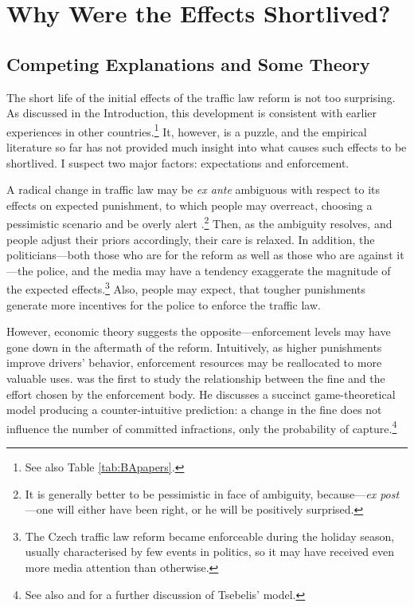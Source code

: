 \documentclass[12pt]{article}
\begin{document}
\section{Why Were the Effects Shortlived?} %
\label{sec:police}

\subsection{Competing Explanations and Some Theory} %

The short life of the initial effects of the traffic law reform is not too
surprising. As discussed in the Introduction, this development is consistent
with earlier experiences in other countries.\footnote{See also Table
  \ref{tab:BApapers}.} It, however, is a puzzle, and the empirical literature so
far has not provided much insight into what causes such effects to be
shortlived. I suspect two major factors: expectations and enforcement. 

A radical change in traffic law may be \emph{ex ante} ambiguous with respect to
its effects on expected punishment, to which people may overreact, choosing a
pessimistic scenario and be overly alert
\citep{alary_ambiguity_2012}.\footnote{It is generally better to be
  pessimistic in face of ambiguity, because---\emph{ex post}---one will either
  have been right, or he will be positively surprised.} Then, as the ambiguity
resolves, and people adjust their priors accordingly, their care is relaxed. In
addition, the politicians---both those who are for the reform as well as those
who are against it---the police, and the media may have a tendency exaggerate
the magnitude of the expected effects.\footnote{The Czech traffic law reform
  became enforceable during the holiday season, usually characterised by few
  events in politics, so it may have received even more media attention than
  otherwise.} Also, people may expect, that tougher punishments generate more
incentives for the police to enforce the traffic law.  

However, economic theory suggests the opposite---enforcement levels may have
gone down in the aftermath of the reform. Intuitively, as higher punishments
improve drivers' behavior, enforcement resources may be reallocated to more
valuable uses. \citet{tsebelis_abuse_1989} was the first to study the
relationship between the fine and the effort chosen by the enforcement body. He
discusses a succinct game-theoretical model producing a counter-intuitive
prediction: a change in the fine does not influence the number of committed
infractions, only the probability of capture.\footnote{See also
  \citet{holler_fighting_1993} and \citet{andreozzi_oscilliations_2002} for a
  further discussion of Tsebelis' model.}
\end{document}
